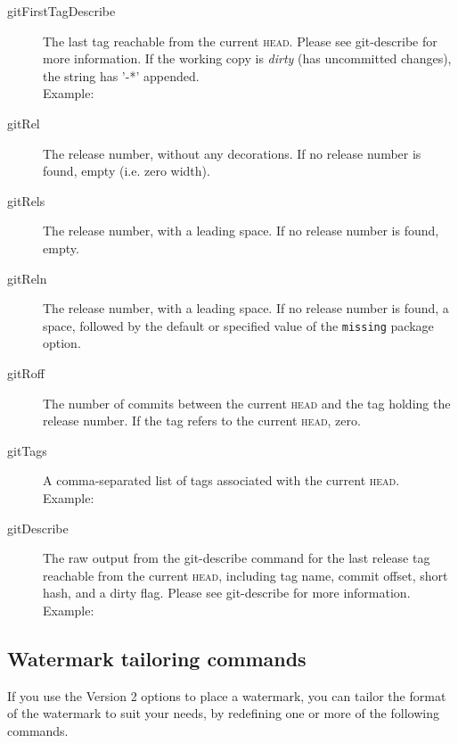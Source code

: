 \documentclass[draft,a4paper,12pt,twoside,openany]{memoir}
\begin{document}
\begin{description}

\item[gitFirstTagDescribe]
	The last tag reachable from the current \textsc{head}.
    Please see git-describe for more information.
    If the working copy is \textit{dirty} (has uncommitted changes),
    the string has '-*' appended.\\
    Example: \textit{\gitFirstTagDescribe}

\item[gitRel]
    The release number, without any decorations.
    If no release number is found, empty (i.e. zero width).

\item[gitRels]
    The release number, with a leading space.
    If no release number is found, empty.

\item[gitReln]
    The release number, with a leading space.
    If no release number is found, a space,
    followed by the default or specified value of
    the \texttt{missing} package option.

\item[gitRoff]
    The number of commits between the current \textsc{head}
    and the tag holding the release number.
    If the tag refers to the current \textsc{head}, zero.

\item[gitTags]
    A comma-separated list of tags associated with the current \textsc{head}.\\
    Example: \textit{\gitTags}

\item[gitDescribe]
    The raw output from the git-describe command for the last release tag
    reachable from the current \textsc{head}, including tag name, commit offset, 
    short hash, and a dirty flag.
    Please see git-describe for more information.
    Example: \textit{\gitDescribe}

\end{description}

\clearpage
\subsection{Watermark tailoring commands}

If you use the Version 2 options to place a watermark,
you can tailor the format of the watermark to suit your needs,
by redefining one or more of the following commands.
\end{document}
